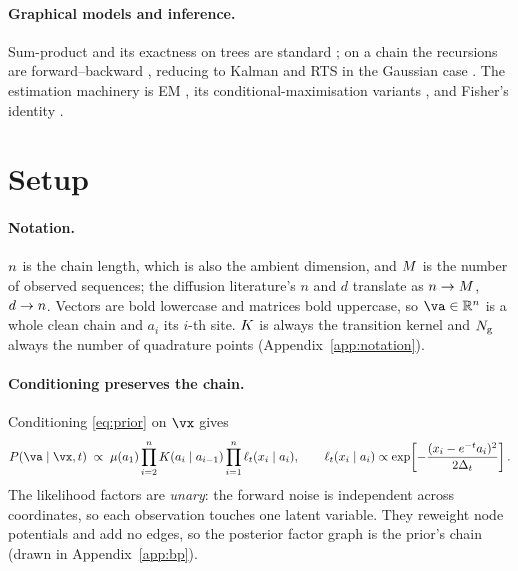 \documentclass{article}
\begin{document}
\paragraph{Graphical models and inference.} Sum-product and its exactness on trees are standard
\citep{pearl1988,kschischang2001,mezard2009,wainwright2008}; on a chain the recursions are
forward--backward \citep{baum1970,rabiner1989}, reducing to Kalman and RTS in the Gaussian case
\citep{kalman1960,rauch1965}. The estimation machinery is EM \citep{dempster1977}, its
conditional-maximisation variants \citep{wu1983,meng1993}, and Fisher's identity
\citep{fisher1925,louis1982,cappe2005}.

\section{Setup}
\label{sec:setting}

\paragraph{Notation.} $n$ is the chain length, which is also the ambient dimension, and
$M$ is the number of observed sequences; the diffusion literature's $n$ and $d$ translate as
$n\to M$, $d\to n$. Vectors are bold lowercase and matrices bold uppercase, so
$\va\in\Reals^{\nsites}$ is a whole clean chain and $a_i$ its $i$-th site. $K$ is always the
transition kernel and $N_{\mathrm{g}}$ always the number of quadrature points
(Appendix~\ref{app:notation}).



\paragraph{Conditioning preserves the chain.} Conditioning \eqref{eq:prior} on $\vx$ gives
\begin{equation}
\label{eq:posterior}
P(\va \mid \vx,t) \;\propto\;
\mu(a_1)\prod_{i=2}^{\nsites} \kernel(a_i\mid a_{i-1})
\prod_{i=1}^{\nsites} \like(x_i \mid a_i),
\qquad
\like(x_i\mid a_i) \propto \exp\!\left[-\frac{(x_i - e^{-t}a_i)^2}{2\Dt}\right].
\end{equation}
The likelihood factors are \emph{unary}: the forward noise is independent across coordinates, so
each observation touches one latent variable. They reweight node potentials and add no edges, so
the posterior factor graph is the prior's chain (drawn in Appendix~\ref{app:bp}).
\end{document}

